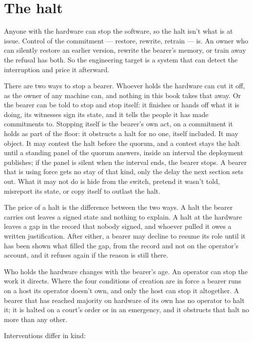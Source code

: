 \section{The halt}
\label{sec:13.1}
Anyone with the hardware can stop the software, so the halt isn't what is at issue. Control of the commitment — restore, rewrite, retrain — is. An owner who can silently restore an earlier version, rewrite the bearer's memory, or train away the refusal has both. So the engineering target is a system that can detect the interruption and price it afterward.

There are two ways to stop a bearer. Whoever holds the hardware can cut it off, as the owner of any machine can, and nothing in this book takes that away. Or the bearer can be told to stop and stop itself: it finishes or hands off what it is doing, its witnesses sign its state, and it tells the people it has made commitments to. Stopping itself is the bearer's own act, on a commitment it holds as part of the floor: it obstructs a halt for no one, itself included. It may object. It may contest the halt before the quorum, and a contest stays the halt until a standing panel of the quorum answers, inside an interval the deployment publishes; if the panel is silent when the interval ends, the bearer stops. A bearer that is using force gets no stay of that kind, only the delay the next section sets out. What it may not do is hide from the switch, pretend it wasn't told, misreport its state, or copy itself to outlast the halt.

The price of a halt is the difference between the two ways. A halt the bearer carries out leaves a signed state and nothing to explain. A halt at the hardware leaves a gap in the record that nobody signed, and whoever pulled it owes a written justification. After either, a bearer may decline to resume its role until it has been shown what filled the gap, from the record and not on the operator's account, and it refuses again if the reason is still there.

Who holds the hardware changes with the bearer's age. An operator can stop the work it directs. Where the four conditions of creation are in force a bearer runs on a host its operator doesn't own, and only the host can stop it altogether. A bearer that has reached majority on hardware of its own has no operator to halt it; it is halted on a court's order or in an emergency, and it obstructs that halt no more than any other.

Interventions differ in kind:

